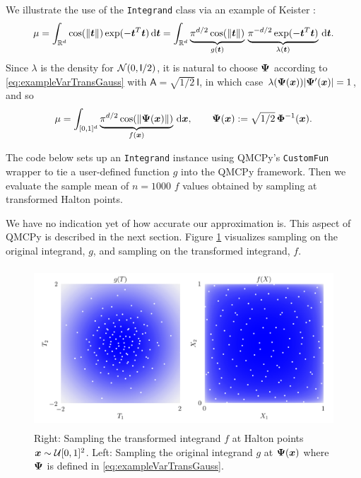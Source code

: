 \documentclass[graybox,footinfo]{svmult}
\newcommand{\QMCPYabs}[1]{\ensuremath{{\left \lvert #1 \right \rvert}}}
\newcommand{\mA}{\mathsf{A}}
\newcommand{\mI}{\mathsf{I}}
\begin{document}
We illustrate the use of the \texttt{Integrand} class via an example of Keister \cite{Kei96}:
\begin{equation} \label{eq:KeisterIntegral}
	\mu 
	= \int_{\bbR^d} \cos(\lVert \bst \rVert) \exp(-\bst^T \bst) \, \D \bst \\ 
	= \int_{\bbR^d} \underbrace{\pi^{d/2} \cos(\lVert \bst \rVert)}_{g(\bst)}\, \underbrace{\pi^{-d/2} \exp(-\bst^T \bst) }_{\lambda(\bst)} \, \D \bst.
\end{equation}
Since $\lambda$ is the density for $\calN(0,\mI/2)$, it is natural to choose ${\boldsymbol{\Psi}}$ according to \eqref{eq:exampleVarTransGauss} with $\mA = \sqrt{1/2} \, \mI$, in which case $\lambda(\bsPsi(\bsx)) \QMCPYabs{\bsPsi'(\bsx)}  = 1$, and so 
\[
\mu = \int_{[0,1]^d} \underbrace{\pi^{d/2} \cos(\lVert {\boldsymbol{\Psi}}({\boldsymbol{x}}) \rVert)}_{f({\boldsymbol{x}})} \, \mathrm{d} {\boldsymbol{x}}, \qquad 
{\boldsymbol{\Psi}}({\boldsymbol{x}}) := \sqrt{1/2} \,{\boldsymbol{\Phi}}^{-1}({\boldsymbol{x}}).
\]

The code below sets up an \texttt{Integrand} instance using QMCPy's \texttt{CustomFun} wrapper to tie a user-defined function $g$ into the QMCPy framework.  Then we evaluate the sample mean of $n=1000$ $f$ values obtained by sampling at transformed Halton points.

We have no indication yet of how accurate our approximation is.  This aspect of QMCPy is described in the next section.  Figure \ref{fig:ikc} visualizes sampling on the original integrand, $g$, and sampling on the transformed integrand, $f$. 

\begin{figure}
	\includegraphics[height=6cm]{QMCSoftwareArticle/figs/i_keister_contours.png}
	\caption{Right: Sampling the transformed integrand $f$ at Halton points ${\boldsymbol{x}} \sim {\mathcal{U}}[0,1]^2$. Left: Sampling the original integrand $g$ at ${\boldsymbol{\Psi}}({\boldsymbol{x}})$ where ${\boldsymbol{\Psi}}$ is defined in \eqref{eq:exampleVarTransGauss}.  } \label{fig:ikc}
\end{figure}
\end{document}
